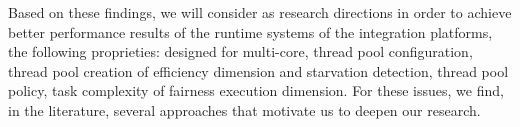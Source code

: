 Based on these findings, we will consider as research directions in order to achieve better performance results of the runtime systems of the integration platforms, the following proprieties: designed for multi-core, thread pool configuration, thread pool creation of efficiency dimension and starvation detection, thread pool policy, task complexity of fairness execution dimension. For these issues, we find, in the literature, several approaches that motivate us to deepen our research.
